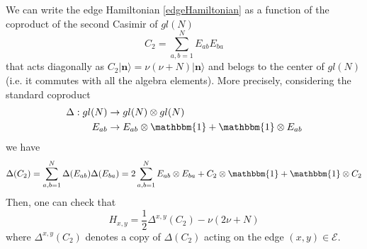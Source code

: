 \documentclass[11pt]{article}
\numberwithin{equation}{section}
\numberwithin{equation}{subsection}
\newcommand{\twoj}{\nu}
\begin{document}
We can write the edge Hamiltonian \eqref{edgeHamiltonian} as a function of the coproduct of the second Casimir of $gl(N)$
\begin{equation}\label{secondCasimir}
    C_{2}=\sum_{a,b=1}^{N}E_{ab}E_{ba}
\end{equation}
that acts diagonally as $C_{2}|\mathbf{n}\rangle=\twoj(\twoj+N)|\mathbf{n}\rangle$ and belogs to the center of $gl(N)$ (i.e. it commutes with all the algebra elements).  
More precisely,  considering the standard coproduct 
\begin{equation}
\begin{split}
\Delta:gl(N)&\to gl(N)\otimes gl(N)\\
E_{ab}&\to E_{ab}\otimes \mathbbm{1}+\mathbbm{1}\otimes E_{ab}
\end{split}
\end{equation}
we have 
\begin{equation}
\Delta(C_{2})=\sum_{a,b=1}^{N}\Delta(E_{ab})\Delta(E_{ba})=2\sum_{a,b=1}^{N}E_{ab}\otimes E_{ba}+C_{2}\otimes \mathbbm{1}+\mathbbm{1}\otimes C_{2}
\end{equation}
Then, one can check that 
\begin{equation}\label{hamiltonianCasimir}
	H_{x,y}=\frac{1}{2}\Delta^{x,y}(C_{2})-\twoj(2\twoj+N)
\end{equation}
where $\Delta^{x,y}(C_2)$ denotes a copy of $\Delta(C_2)$ acting on  
the edge $(x,y)\in \mathcal{E}$.
\end{document}
